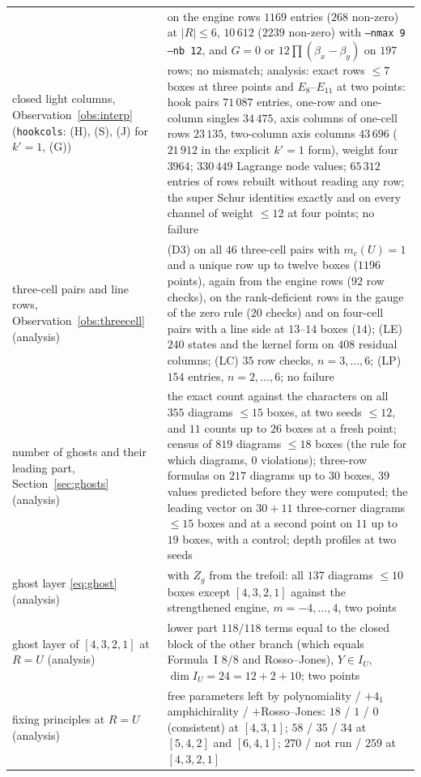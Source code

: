 \documentclass[11pt]{article}
\newcommand{\LMPH}[1]{\texttt{#1}}
\begin{document}
\begin{longtable}{p{}p{}}
closed light columns, Observation~\ref{obs:interp} (\LMPH{hookcols}: (H), (S), (J) for $k'=1$, (G)) & on the engine rows $1169$ entries ($268$ non-zero) at $|R|\le6$, $10\,612$ ($2239$ non-zero) with \LMPH{--nmax 9 --nb 12}, and $G=0$ or $12\prod(\beta_x-\beta_y)$ on $197$ rows; no mismatch; analysis: exact rows $\le7$ boxes at three points and $E_8$--$E_{11}$ at two points: hook pairs $71\,087$ entries, one-row and one-column singles $34\,475$, axis columns of one-cell rows $23\,135$, two-column axis columns $43\,696$ ($21\,912$ in the explicit $k'=1$ form), weight four $3964$; $330\,449$ Lagrange node values; $65\,312$ entries of rows rebuilt without reading any row; the super Schur identities exactly and on every channel of weight $\le12$ at four points; no failure\\
three-cell pairs and line rows, Observation~\ref{obs:threecell} (analysis) & (D3) on all $46$ three-cell pairs with $m_c(U)=1$ and a unique row up to twelve boxes ($1196$ points), again from the engine rows ($92$ row checks), on the rank-deficient rows in the gauge of the zero rule ($20$ checks) and on four-cell pairs with a line side at $13$--$14$ boxes ($14$); (LE) $240$ states and the kernel form on $408$ residual columns; (LC) $35$ row checks, $n=3,\dots,6$; (LP) $154$ entries, $n=2,\dots,6$; no failure\\
number of ghosts and their leading part, Section~\ref{sec:ghosts} (analysis) & the exact count against the characters on all $355$ diagrams $\le15$ boxes, at two seeds $\le12$, and $11$ counts up to $26$ boxes at a fresh point; census of $819$ diagrams $\le18$ boxes (the rule for which diagrams, $0$ violations); three-row formulas on $217$ diagrams up to $30$ boxes, $39$ values predicted before they were computed; the leading vector on $30+11$ three-corner diagrams $\le15$ boxes and at a second point on $11$ up to $19$ boxes, with a control; depth profiles at two seeds\\
ghost layer \eqref{eq:ghost} (analysis) & with $Z_g$ from the trefoil: all $137$ diagrams $\le10$ boxes except $[4,3,2,1]$ against the strengthened engine, $m=-4,\dots,4$, two points\\
ghost layer of $[4,3,2,1]$ at $R=U$ (analysis) & lower part $118/118$ terms equal to the closed block of the other branch (which equals Formula~I $8/8$ and Rosso--Jones), $Y\in I_U$, $\dim I_U=24=12+2+10$; two points\\
fixing principles at $R=U$ (analysis) & free parameters left by polynomiality / $+4_1$ amphichirality / $+$Rosso--Jones: $18$ / $1$ / $0$ (consistent) at $[4,3,1]$; $58$ / $35$ / $34$ at $[5,4,2]$ and $[6,4,1]$; $270$ / not run / $259$ at $[4,3,2,1]$\\

\end{longtable}
\end{document}

